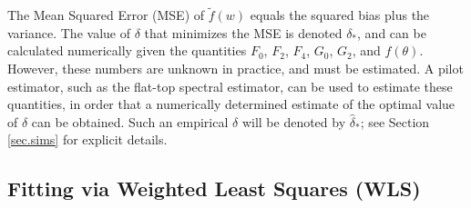 \documentclass[12p E.Lt,psfig]{article} %
\begin{document}
\vspace{.5cm}

  The Mean Squared Error (MSE) of $\tilde f(w)$ equals the squared bias plus the variance.
The value of $\delta$ that minimizes the   MSE is denoted $\delta_*$, and  can be calculated numerically given
the quantities $F_0$, $F_2$, $F_4$, $G_0$,  $G_2$, and $f(\theta)$.  However, these
 numbers are unknown in practice, and must be estimated.  A pilot estimator, such as the flat-top
 spectral estimator, can be used to estimate these quantities, in order that a numerically
  determined estimate of the optimal value of $\delta$ can be obtained.
  Such an empirical $\delta$ will be denoted by $\widehat{\delta}_*$; see Section \ref{sec.sims} for
   explicit details.



\subsection{Fitting via Weighted Least Squares (WLS)}
\label{se:WLS}
\end{document}
